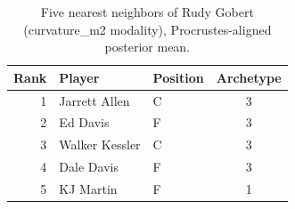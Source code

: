 \begin{table}[htbp]
  \centering\small
  \begin{tabular}{rllc}
    \toprule
    Rank & Player & Position & Archetype \\
    \midrule
    1 & Jarrett Allen & C & 3 \\
    2 & Ed Davis & F & 3 \\
    3 & Walker Kessler & C & 3 \\
    4 & Dale Davis & F & 3 \\
    5 & KJ Martin & F & 1 \\
    \bottomrule
  \end{tabular}
  \caption{Five nearest neighbors of Rudy Gobert (curvature_m2 modality), Procrustes-aligned posterior mean.}
  \label{tab:Rudy_Gobert_neighbors_curvature_m2}
\end{table}

